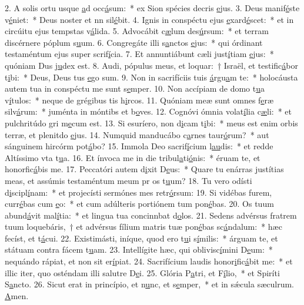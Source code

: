 2. A solis ortu usque \uline{a}d occ\uline{á}sum:~* ex Sion spécies decris \uline{e}jus.
3. Deus manif\uline{é}ste v\uline{é}niet:~* Deus noster et nn sil\uline{é}bit.
4. Ignis in conspéctu ejus \uline{e}xard\uline{é}scet:~* et in circúitu ejus tempstas v\uline{á}lida.
5. Advocábit c\uline{æ}lum des\uline{ú}rsum:~* et terram discérnere póplum s\uline{u}um.
6. Congregáte illi s\uline{a}nctos \uline{e}jus:~* qui órdinant testaméntum ejus super scrif\uline{í}cia.
7. Et annuntiábunt cæli just\uline{í}tiam \uline{e}jus:~* quóniam Dus j\uline{u}dex est.
8. Audi, pópulus meus, et loquar:~† Israël, et testific\uline{á}bor t\uline{i}bi:~* Deus, Deus tus \uline{e}go sum.
9. Non in sacrifíciis tuis \uline{á}rgu\uline{a}m te:~* holocáusta autem tua in conspéctu me sunt s\uline{e}mper.
10. Non accípiam de domo t\uline{u}a v\uline{í}tulos:~* neque de grégibus tis h\uline{i}rcos.
11. Quóniam meæ sunt omnes f\uline{e}ræ silv\uline{á}rum:~* juménta in móntibs et b\uline{o}ves.
12. Cognóvi ómnia volat\uline{í}lia c\uline{æ}li:~* et pulchritúdo gri m\uline{e}cum est.
13. Si esuríero, non d\uline{i}cam t\uline{i}bi:~* meus est enim orbis terræ, et plenitdo \uline{e}jus.
14. Numquid manducábo c\uline{a}rnes taur\uline{ó}rum?~* aut sánguinem hircórm pot\uline{á}bo?
15. Immola Deo sacrif\uline{í}cium l\uline{au}dis:~* et redde Altíssimo vta t\uline{u}a.
16. Et ínvoca me in die tribul\uline{a}ti\uline{ó}nis:~* éruam te, et honorfic\uline{á}bis me.
17. Peccatóri autem d\uline{i}xit D\uline{e}us:~* Quare tu enárras justítias meas, et assúmis testaméntum meum pr os t\uline{u}um?
18. Tu vero odísti d\uline{i}scipl\uline{í}nam:~* et projecísti sermónes mes retr\uline{ó}rsum:
19. Si vidébas furem, curr\uline{é}bas cum \uline{e}o:~* et cum adúlteris portiónem tum pon\uline{é}bas.
20. Os tuum abund\uline{á}vit mal\uline{í}tia:~* et lingua tua concinnbat d\uline{o}los.
21. Sedens advérsus fratrem tuum loquebáris,~† et advérsus fílium matris tuæ pon\uline{é}bas sc\uline{á}ndalum:~* hæc fecíst, et t\uline{á}cui.
22. Existimásti, iníque, quod ero t\uline{u}i s\uline{í}milis:~* árguam te, et státuam contra fácem t\uline{u}am.
23. Intellígite hæc, qui oblivisc\uline{í}mini D\uline{e}um:~* nequándo rápiat, et non sit  er\uline{í}piat.
24. Sacrifícium laudis honor\uline{i}fic\uline{á}bit me:~* et illic iter, quo osténdam illi salutre D\uline{e}i.
25. Glória P\uline{a}tri, et F\uline{í}lio,~* et Spiríti S\uline{a}ncto.
26. Sicut erat in princípio, et n\uline{u}nc, et s\uline{e}mper,~* et in sǽcula sæculrum. \uline{A}men.
